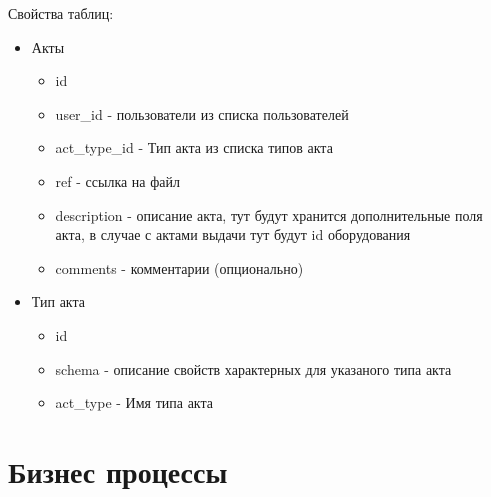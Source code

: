 \documentclass[11pt]{article}
\begin{document}
\begin{description}
	Свойства таблиц:
	\begin{itemize}
		\item Акты
		\begin{itemize}
			\item id
			\item user\_id - пользователи из списка пользователей
			\item act\_type\_id - Тип акта из списка типов акта
			\item ref - ссылка на файл
			\item description - описание акта, тут будут хранится дополнительные поля акта, в случае с актами выдачи тут будут id оборудования
			\item comments - комментарии (опционально)
		\end{itemize}
	\end{itemize}
	
	\begin{itemize}
		\item Тип акта
		\begin{itemize}
			\item id
			\item schema - описание свойств характерных для указаного типа акта
			\item act\_type - Имя типа акта
		\end{itemize}
	\end{itemize}
\end{description}
\section{Бизнес процессы}
\end{document}
